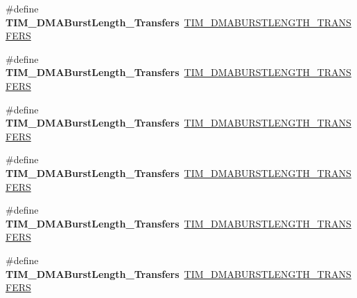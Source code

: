 \begin{DoxyCompactItemize}
\#define {\bfseries T\+I\+M\+\_\+\+D\+M\+A\+Burst\+Length\+\_\+Transfers}~\mbox{\hyperlink{group___t_i_m___d_m_a___burst___length_ga73fff75a3f0247c61a84a42e8cb83572}{T\+I\+M\+\_\+\+D\+M\+A\+B\+U\+R\+S\+T\+L\+E\+N\+G\+T\+H\+\_\+T\+R\+A\+N\+S\+F\+E\+RS}}
\item 
\mbox{\label{group___h_a_l___t_i_m___aliased___defines_ga2fc09f2148cf6ebddc8e67116212259c}} 
\#define {\bfseries T\+I\+M\+\_\+\+D\+M\+A\+Burst\+Length\+\_\+Transfers}~\mbox{\hyperlink{group___t_i_m___d_m_a___burst___length_ga793a89bb8a0669e274de451985186c53}{T\+I\+M\+\_\+\+D\+M\+A\+B\+U\+R\+S\+T\+L\+E\+N\+G\+T\+H\+\_\+T\+R\+A\+N\+S\+F\+E\+RS}}
\item 
\mbox{\label{group___h_a_l___t_i_m___aliased___defines_ga0ca63a3caeaf1e85bd54961891949de7}} 
\#define {\bfseries T\+I\+M\+\_\+\+D\+M\+A\+Burst\+Length\+\_\+Transfers}~\mbox{\hyperlink{group___t_i_m___d_m_a___burst___length_ga79ab58b6a3b30c54c0758b381df22cb0}{T\+I\+M\+\_\+\+D\+M\+A\+B\+U\+R\+S\+T\+L\+E\+N\+G\+T\+H\+\_\+T\+R\+A\+N\+S\+F\+E\+RS}}
\item 
\mbox{\label{group___h_a_l___t_i_m___aliased___defines_ga9160d52913bbd7ad1e663ff943d01852}} 
\#define {\bfseries T\+I\+M\+\_\+\+D\+M\+A\+Burst\+Length\+\_\+Transfers}~\mbox{\hyperlink{group___t_i_m___d_m_a___burst___length_gaf52962b501b3a76d89df6274ed425947}{T\+I\+M\+\_\+\+D\+M\+A\+B\+U\+R\+S\+T\+L\+E\+N\+G\+T\+H\+\_\+T\+R\+A\+N\+S\+F\+E\+RS}}
\item 
\mbox{\label{group___h_a_l___t_i_m___aliased___defines_ga11485e9eee8a6a7edc1df868755eab85}} 
\#define {\bfseries T\+I\+M\+\_\+\+D\+M\+A\+Burst\+Length\+\_\+Transfers}~\mbox{\hyperlink{group___t_i_m___d_m_a___burst___length_ga06a81eba628bea6495d86ebcc6021da0}{T\+I\+M\+\_\+\+D\+M\+A\+B\+U\+R\+S\+T\+L\+E\+N\+G\+T\+H\+\_\+T\+R\+A\+N\+S\+F\+E\+RS}}
\item 
\mbox{\label{group___h_a_l___t_i_m___aliased___defines_gab1a097ca7404e518839df99795443fb0}} 
\#define {\bfseries T\+I\+M\+\_\+\+D\+M\+A\+Burst\+Length\+\_\+Transfers}~\mbox{\hyperlink{group___t_i_m___d_m_a___burst___length_ga5f430b76c0aeded0a8d8be779f26ae52}{T\+I\+M\+\_\+\+D\+M\+A\+B\+U\+R\+S\+T\+L\+E\+N\+G\+T\+H\+\_\+T\+R\+A\+N\+S\+F\+E\+RS}}

\end{DoxyCompactItemize}
